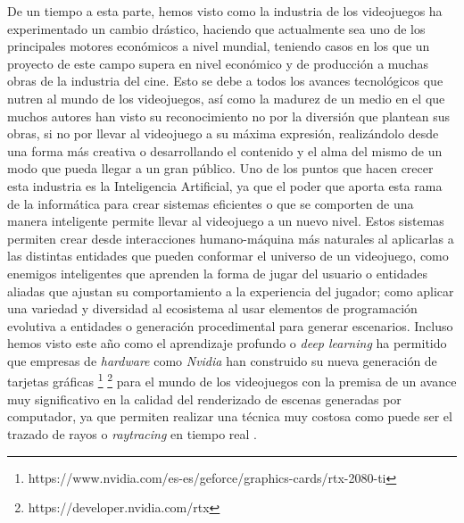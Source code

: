 De un tiempo a esta parte, hemos visto como la industria de los videojuegos ha experimentado un cambio drástico, haciendo que actualmente sea uno de los principales motores económicos a nivel mundial, teniendo casos en los que un proyecto de este campo supera en nivel económico y de producción a muchas obras de la industria del cine. Esto se debe a todos los avances tecnológicos que nutren al mundo de los videojuegos, así como la madurez de un medio en el que muchos autores han visto su reconocimiento no por la diversión que plantean sus obras, si no por llevar al videojuego a su máxima expresión, realizándolo desde una forma más creativa o desarrollando el contenido y el alma del mismo de un modo que pueda llegar a un gran público. Uno de los puntos que hacen crecer esta industria es la Inteligencia Artificial, ya que el poder que aporta esta rama de la informática para crear sistemas eficientes o que se comporten de una manera inteligente permite llevar al videojuego a un nuevo nivel. Estos sistemas permiten crear desde interacciones humano-máquina más naturales al aplicarlas a las distintas entidades que pueden conformar el universo de un videojuego, como enemigos inteligentes que aprenden la forma de jugar del usuario o entidades aliadas que ajustan su comportamiento a la experiencia del jugador; como aplicar una variedad y diversidad al ecosistema al usar elementos de programación evolutiva a entidades \cite{5286468} o generación procedimental \cite{parkin_2016} para generar escenarios. Incluso hemos visto este año como el aprendizaje profundo o \textit{deep learning} ha permitido que empresas de \textit{hardware} como \textit{Nvidia} han construido su nueva generación de tarjetas gráficas \footnote{https://www.nvidia.com/es-es/geforce/graphics-cards/rtx-2080-ti} \footnote{https://developer.nvidia.com/rtx} para el mundo de los videojuegos con la premisa de un avance muy significativo en la calidad del renderizado de escenas generadas por computador, ya que permiten realizar una técnica muy costosa como puede ser el trazado de rayos o \textit{raytracing} \cite{Whitted:1980:IIM:358876.358882} en tiempo real \cite{Parker:2013:GRT:2447976.2447997}. \\

